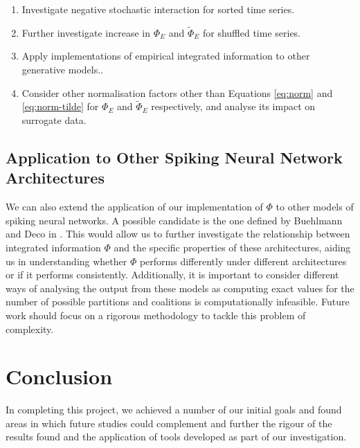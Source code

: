 \documentclass[a4paper,11pt]{article}
\begin{document}
\begin{enumerate}
\item{Investigate negative stochastic interaction for sorted time series.}
\item{Further investigate increase in $\Phi_E$ and $\widetilde{\Phi}_E$ for shuffled time series.}
\item{Apply implementations of empirical integrated information to other generative models.}.
\item{Consider other normalisation factors other than Equations \ref{eq:norm} and \ref{eq:norm-tilde} for $\Phi_E$ and $\widetilde{\Phi}_E$ respectively, and analyse its impact on surrogate data.}
\end{enumerate}

\subsection{Application to Other Spiking Neural Network Architectures}
\label{sec:fw:snn}
We can also extend the application of our implementation of $\Phi$ to other models of spiking neural networks. A possible candidate is the one defined by Buehlmann and Deco in \cite{Buehlmann2010}. This would allow us to further investigate the relationship between integrated information $\Phi$ and the specific properties of these architectures, aiding us in understanding whether $\Phi$ performs differently under different architectures or if it performs consistently. Additionally, it is important to consider different ways of analysing the output from these models as computing exact values for the number of possible partitions and coalitions is computationally infeasible. Future work should focus on a rigorous methodology to tackle this problem of complexity.

\clearpage

\section{Conclusion}
\label{sec:conclusion}

In completing this project, we achieved a number of our initial goals and found areas in which future studies could complement and further the rigour of the results found and the application of tools developed as part of our investigation.
\end{document}
